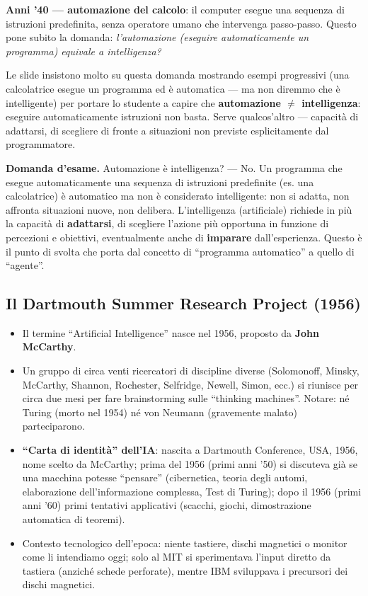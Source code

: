\documentclass[11pt,a4paper]{report}
\newcommand{\domandaesame}[1]{\begin{esame}\textbf{Domanda d'esame.} #1\end{esame}}
\begin{document}
\textbf{Anni '40 --- automazione del calcolo}: il computer esegue una sequenza di istruzioni predefinita, senza operatore umano che intervenga passo-passo. Questo pone subito la domanda: \emph{l'automazione (eseguire automaticamente un programma) equivale a intelligenza?}

Le slide insistono molto su questa domanda mostrando esempi progressivi (una calcolatrice esegue un programma ed è automatica --- ma non diremmo che è intelligente) per portare lo studente a capire che \textbf{automazione $\neq$ intelligenza}: eseguire automaticamente istruzioni non basta. Serve qualcos'altro --- capacità di adattarsi, di scegliere di fronte a situazioni non previste esplicitamente dal programmatore.

\domandaesame{Automazione è intelligenza? --- No. Un programma che esegue automaticamente una sequenza di istruzioni predefinite (es. una calcolatrice) è automatico ma non è considerato intelligente: non si adatta, non affronta situazioni nuove, non delibera. L'intelligenza (artificiale) richiede in più la capacità di \textbf{adattarsi}, di scegliere l'azione più opportuna in funzione di percezioni e obiettivi, eventualmente anche di \textbf{imparare} dall'esperienza. Questo è il punto di svolta che porta dal concetto di ``programma automatico'' a quello di ``agente''.}

\subsection{Il Dartmouth Summer Research Project (1956)}

\begin{itemize}
  \item Il termine ``Artificial Intelligence'' nasce nel 1956, proposto da \textbf{John McCarthy}.
  \item Un gruppo di circa venti ricercatori di discipline diverse (Solomonoff, Minsky, McCarthy, Shannon, Rochester, Selfridge, Newell, Simon, ecc.) si riunisce per circa due mesi per fare brainstorming sulle ``thinking machines''. Notare: né Turing (morto nel 1954) né von Neumann (gravemente malato) parteciparono.
  \item \textbf{``Carta di identità'' dell'IA}: nascita a Dartmouth Conference, USA, 1956, nome scelto da McCarthy; prima del 1956 (primi anni '50) si discuteva già se una macchina potesse ``pensare'' (cibernetica, teoria degli automi, elaborazione dell'informazione complessa, Test di Turing); dopo il 1956 (primi anni '60) primi tentativi applicativi (scacchi, giochi, dimostrazione automatica di teoremi).
  \item Contesto tecnologico dell'epoca: niente tastiere, dischi magnetici o monitor come li intendiamo oggi; solo al MIT si sperimentava l'input diretto da tastiera (anziché schede perforate), mentre IBM sviluppava i precursori dei dischi magnetici.
\end{itemize}
\end{document}
